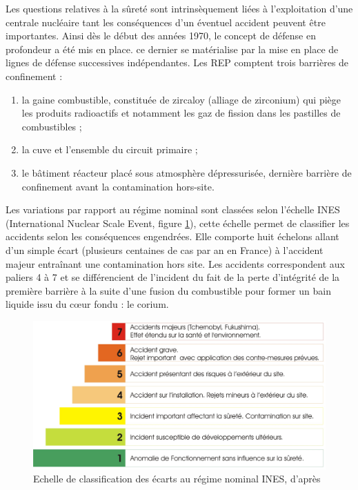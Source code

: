 Les questions relatives à la sûreté sont intrinsèquement liées à l'exploitation d'une centrale nucléaire tant les conséquences d'un éventuel accident peuvent être importantes. Ainsi dès le début des années 1970, le concept de défense en profondeur a été mis en place. ce dernier se matérialise par la mise en place de lignes de défense successives indépendantes. Les REP comptent trois barrières de confinement :
\begin{enumerate}
	\item la gaine combustible, constituée de zircaloy (alliage de zirconium) qui piège les produits radioactifs et notamment les gaz de fission dans les pastilles de combustibles ;
	\item la cuve et l'ensemble du circuit primaire ;
	\item le bâtiment réacteur placé sous atmosphère dépressurisée, dernière barrière de confinement avant la contamination hors-site.
\end{enumerate}
Les variations par rapport au régime nominal sont classées selon l'échelle INES (International Nuclear Scale Event, figure \ref{fig:echelle-ines-article}), cette échelle permet de classifier les accidents selon les conséquences engendrées. Elle comporte huit échelons allant d'un simple écart (plusieurs centaines de cas par an en France) à l'accident majeur entraînant une contamination hors site. Les accidents correspondent aux paliers 4 à 7 et se différencient de l'incident du fait de la perte d'intégrité de la première barrière à la suite d'une fusion du combustible pour former un bain liquide issu du c\oe ur fondu : le corium.
\begin{figure}[H]
	\centering
	\includegraphics[width=1\linewidth]{figure/RTN_ines}
	\caption[Echelle de classification des écarts au régime nominal INES]{Echelle de classification des écarts au régime nominal INES, d'après \cite{noauthor_risque_nodate}}
	\label{fig:echelle-ines-article}
\end{figure}
